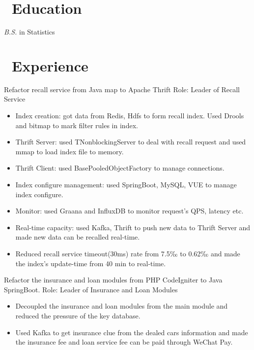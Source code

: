 \documentclass{resume}
\begin{document}



\section{\faGraduationCap\ Education}
\textit{B.S.} in Statistics

\section{\faUsers\ Experience}
Refactor recall service from Java map to Apache Thrift
\newline Role: Leader of Recall Service
\begin{itemize}
  \item Index creation: got data from Redis, Hdfs to form recall index. Used Drools and bitmap to mark filter rules in index.
  \item Thrift Server: used TNonblockingServer to deal with recall request and used mmap to load index file to memory.
  \item Thrift Client: used BasePooledObjectFactory to manage connections.
  \item Index configure management: used SpringBoot, MySQL, VUE to manage index configure.
  \item Monitor: used Graana and InfluxDB to monitor request's QPS, latency etc.
  \item Real-time capacity: used Kafka, Thrift to push new data to Thrift Server and made new data can be recalled real-time.
  \item Reduced recall service timeout(30ms) rate from 7.5‰ to 0.62‰ and made the index's update-time from 40 min to real-time.
\end{itemize}

Refactor the insurance and loan modules from PHP CodeIgniter to Java SpringBoot.
\newline Role: Leader of Insurance and Loan Modules
\begin{itemize}
  \item Decoupled the insurance and loan modules from the main module and reduced the pressure of the key database.
  \item Used Kafka to get insurance clue from the dealed cars information and made the insurance fee and loan service fee can be paid through WeChat Pay.
\end{itemize}
\end{document}
